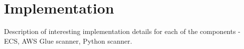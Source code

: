 \chapter{Implementation}

Description of interesting implementation details for each of the components - ECS, AWS Glue scanner, Python scanner.